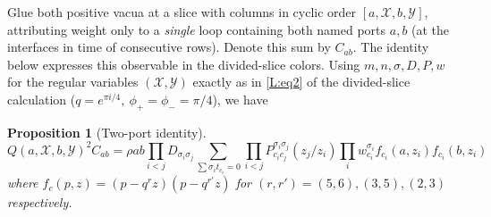 \documentclass[11pt]{article}
\numberwithin{equation}{section}
\newtheorem*{unnumberedproposition}{Proposition}
\theoremstyle{definition}\newtheorem{definition}[theorem]{Definition}
\theoremstyle{remark}\newtheorem{remark}[theorem]{Remark}
\begin{document}
Glue both positive vacua at a slice with columns in cyclic order \([a,\mathcal X,b,\mathcal Y]\), attributing weight only to a \emph{single} loop containing both named ports \(a,b\) (at the interfaces in time of consecutive rows). Denote this sum by \(C_{ab}\). The identity below expresses this observable in the divided-slice colors.
Using \(m,n,\sigma,D,P,w\) for the regular variables \((\mathcal X,\mathcal Y)\) exactly as in \eqref{L:eq2} of the divided-slice calculation (\(q=e^{\pi i/4},\ \phi_+=\phi_-=\pi/4\)), we have
\begin{unnumberedproposition}[Two-port identity]
\label{L:prop:two-port-identity}
\begin{equation}
 Q(a,\mathcal X,b,\mathcal Y)^2 C_{ab} =
 \rho a b \prod_{i<j}D_{\sigma_i\sigma_j}
 \sum_{\sum \sigma_i t_{c_i}=0}
 \prod_{i<j}P^{\sigma_i\sigma_j}_{c_i c_j}(z_j/z_i)
 \prod_i w_{c_i}^{\sigma_i} f_{c_i}(a,z_i) f_{c_i}(b,z_i)\label{L:eq7}
\end{equation}
where \(f_c(p,z)=(p-q^r z)(p-q^{r'}z)\) for \((r,r')=(5,6),(3,5),(2,3)\) respectively.
\end{unnumberedproposition}
\end{document}
